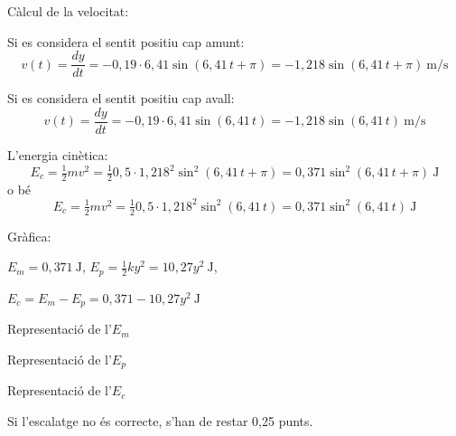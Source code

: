 \begin{solapartat}
 Càlcul de la velocitat:

Si es considera el sentit positiu cap amunt:
\[ v(t) = \frac{dy}{dt} = -0,19\cdot 6,41\sin(6,41\,t + \pi) = -1,218\sin(6,41\,t + \pi)\ \mathrm{m/s} \]

Si es considera el sentit positiu cap avall:
\[ v(t) = \frac{dy}{dt} = -0,19\cdot 6,41\sin(6,41\,t) = -1,218\sin(6,41\,t)\ \mathrm{m/s} \]

 L'energia cinètica:
\[ E_c = \tfrac{1}{2}mv^2 = \tfrac{1}{2}0,5\cdot 1,218^2\sin^2(6,41\,t + \pi) = 0,371\sin^2(6,41\,t + \pi)\ \mathrm{J} \]
o bé
\[ E_c = \tfrac{1}{2}mv^2 = \tfrac{1}{2}0,5\cdot 1,218^2\sin^2(6,41\,t) = 0,371\sin^2(6,41\,t)\ \mathrm{J} \]

Gràfica:

$E_m = 0,371\ \mathrm{J}$, \quad $E_p = \frac{1}{2}ky^2 = 10,27y^2\ \mathrm{J}$,

$E_c = E_m - E_p = 0,371 - 10,27y^2\ \mathrm{J}$


 Representació de l'$E_m$

 Representació de l'$E_p$

 Representació de l'$E_c$

Si l'escalatge no és correcte, s'han de restar 0,25 punts.
\end{solapartat}
